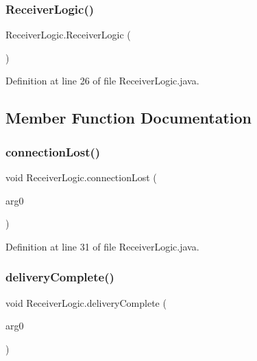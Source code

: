 \subsubsection{\texorpdfstring{Receiver\+Logic()}{ReceiverLogic()}}
{\footnotesize\ttfamily Receiver\+Logic.\+Receiver\+Logic (\begin{DoxyParamCaption}{ }\end{DoxyParamCaption})}



Definition at line 26 of file Receiver\+Logic.\+java.



\subsection{Member Function Documentation}
\mbox{\label{class_receiver_logic_a10d83eeaf19038a5c41e2038b7dc450a}} 
\subsubsection{\texorpdfstring{connection\+Lost()}{connectionLost()}}
{\footnotesize\ttfamily void Receiver\+Logic.\+connection\+Lost (\begin{DoxyParamCaption}\item[{Throwable}]{arg0 }\end{DoxyParamCaption})}



Definition at line 31 of file Receiver\+Logic.\+java.

\mbox{\label{class_receiver_logic_afbfe0394c17c18e33ed70e7ec8eeea84}} 
\subsubsection{\texorpdfstring{delivery\+Complete()}{deliveryComplete()}}
{\footnotesize\ttfamily void Receiver\+Logic.\+delivery\+Complete (\begin{DoxyParamCaption}\item[{I\+Mqtt\+Delivery\+Token}]{arg0 }\end{DoxyParamCaption})}



